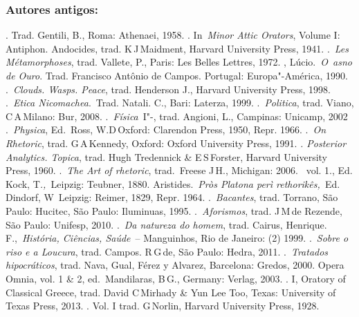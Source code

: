 { 

\subsubsection{Autores antigos:}

 

\begin{bibliohedra}
. Trad. Gentili, B., Roma: Athenaei, 1958.
. In~\emph{Minor Attic Orators}, Volume I: Antiphon.
  Andocides, trad. K\,J\,Maidment, Harvard University Press, 1941.
.~\emph{Les Métamorphoses}, trad. Vallete, P., Paris: Les Belles
  Lettres, 1972.
, Lúcio.~\emph{O~asno de Ouro}. Trad. Francisco Antônio de
  Campos. Portugal: Europa"-América, 1990.
.~\emph{Clouds. Wasps. Peace}, trad. Henderson J., Harvard
  University Press, 1998.
.~\emph{Etica Nicomachea}.~Trad. Natali. C., Bari: Laterza,
  1999.
.~\emph{Politica}, trad. Viano, C\,A\,Milano: Bur, 2008.
.~\emph{Física}~I"-, trad. Angioni, L., Campinas: Unicamp,
  2002
.~\emph{Physica}, Ed.~Ross, W.D\,Oxford: Clarendon Press,
  1950, Repr. 1966.
.~\emph{On Rhetoric}, trad. G\,A\,Kennedy, Oxford: Oxford
  University Press, 1991.
\emph{. Posterior Analytics. Topica}, trad. Hugh Tredennick
  \& E\,S\,Forster, Harvard University Press, 1960.
.~\emph{The Art of rhetoric}, trad.~Freese J\,H., Michigan:
  2006.
~vol. 1., Ed. Kock,
  T\emph{.,~}Leipzig: Teubner, 1880.
 Aristides.~\emph{Pròs Platona perì rethorikês,~}Ed. Dindorf, W\,  Leipzig: Reimer, 1829, Repr. 1964.
.~\emph{Bacantes}, trad.  Torrano, São Paulo: Hucitec,
  São Paulo: Iluminuas, 1995.
.~\emph{Aforismos}, trad. J\,M\,de Rezende, São Paulo:
  Unifesp, 2010.
.~\emph{Da natureza do homem}, trad. Cairus, Henrique.
  F.,~\emph{História, Ciências, Saúde}~-- Manguinhos, Rio de Janeiro: 
  (2) 1999.
.~\emph{Sobre o riso e a Loucura}, trad. Campos. R\,G\,de,
  São Paulo: Hedra, 2011.
.~\emph{Tratados hipocráticos}, trad. Nava, Gual, Férez y
  Alvarez, Barcelona: Gredos, 2000.
 Opera Omnia, vol. 1 \& 2, ed.~Mandilaras, B\,G., Germany:
  Verlag, 2003.
. I, Oratory of Classical Greece, trad. David C\,Mirhady \&
  Yun Lee Too, Texas: University of Texas Press, 2013.
. Vol. I trad. G\,Norlin, Harvard University Press, 1928.

\end{bibliohedra}}
